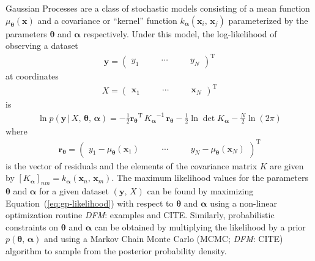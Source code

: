 \documentclass[manuscript, letterpaper]{aastex6}
\makeatletter
\let\origsection\section
\renewcommand\section{\@ifstar{\starsection}{\nostarsection}}
\newcommand\nostarsection[1]{\sectionprelude\origsection{#1}}
\newcommand\starsection[1]{\sectionprelude\origsection*{#1}}
\newcommand\sectionprelude{\vspace{1em}}
\renewcommand{\eqref}[1]{\ref{eq:#1}}
\newcommand{\Eq}[1]{Equation~(\eqref{#1})}
\newcommand{\eq}[1]{\Eq{#1}}
\newcommand{\eqlabel}[1]{\label{eq:#1}}
\newcommand{\sectlabel}[1]{\label{sect:#1}}
\newcommand{\T}{\ensuremath{\mathrm{T}}}
\newcommand{\bvec}[1]{{\ensuremath{\boldsymbol{#1}}}}
\newcommand{\todo}[3]{{\color{#2}\emph{#1}: #3}}
\newcommand{\dfmtodo}[1]{\todo{DFM}{red}{#1}}
\makeatother
\begin{document}
\section{Gaussian processes}\sectlabel{gps}

Gaussian Processes \citep[GPs;][]{Rasmussen:2006} are a class of stochastic
models consisting of a mean function $\mu_\bvec{\theta}(\bvec{x})$ and a
covariance or ``kernel'' function $k_\bvec{\alpha}(\bvec{x}_i,\,\bvec{x}_j)$
parameterized by the parameters $\bvec{\theta}$ and $\bvec{\alpha}$
respectively.
Under this model, the log-likelihood of observing a dataset
\begin{eqnarray}
\bvec{y} = \left(\begin{array}{ccccc}
    y_1\quad && \cdots\quad && y_N
\end{array}\right)^\T
\end{eqnarray}
at coordinates
\begin{eqnarray}
X = \left(\begin{array}{ccccc}
    \bvec{x}_1\quad && \cdots\quad && \bvec{x}_N
\end{array}\right)^\T
\end{eqnarray}
is
\begin{eqnarray}\eqlabel{gp-likelihood}
\ln{p(\bvec{y}\,|\,{X,\,\bvec{\theta}},\,\bvec{\alpha})} =
    -\frac{1}{2} {\bvec{r}_\bvec{\theta}}^\T\,{K_\bvec{\alpha}}^{-1}\,
        \bvec{r}_\bvec{\theta}
    -\frac{1}{2}\ln\det K_\bvec{\alpha}
    - \frac{N}{2} \ln{(2\pi)}
\end{eqnarray}
where
\begin{eqnarray}
    \bvec{r}_\bvec{\theta} = \left(\begin{array}{ccccc}
    y_1 - \mu_\bvec{\theta}(\bvec{x}_1)\quad && \cdots\quad &&
    y_N - \mu_\bvec{\theta}(\bvec{x}_N)
\end{array}\right)^\T
\end{eqnarray}
is the vector of residuals and the elements of the covariance matrix $K$ are
given by $[K_\bvec{\alpha}]_{nm} = k_\bvec{\alpha}(\bvec{x}_n,\,\bvec{x}_m)$.
The maximum likelihood values for the parameters $\bvec{\theta}$ and
$\bvec{\alpha}$ for a given dataset $(\bvec{y},\,X)$ can be found by
maximizing \eq{gp-likelihood} with respect to $\bvec{\theta}$ and
$\bvec{\alpha}$ using a non-linear optimization routine \dfmtodo{examples and
CITE}.
Similarly, probabilistic constraints on $\bvec{\theta}$ and $\bvec{\alpha}$
can be obtained by multiplying the likelihood by a prior
$p(\bvec{\theta},\,\bvec{\alpha})$ and using a Markov Chain Monte Carlo (MCMC;
\dfmtodo{CITE}) algorithm to sample from the posterior probability density.
\end{document}

